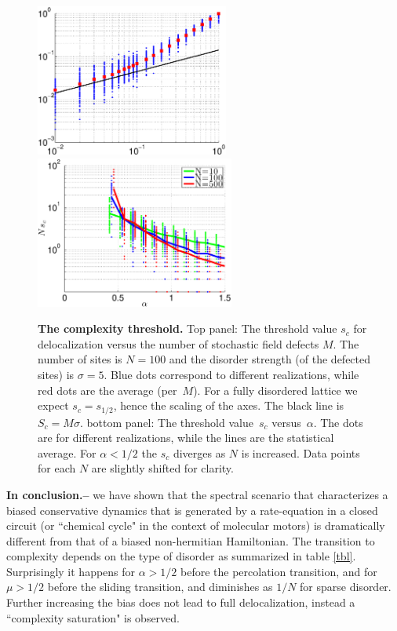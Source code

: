 \documentclass[aps,pre,floats,floatfix,twocolumn]{revtex4}
\newcommand{\Eq}[1]{\textcolor{blue}{{equation}\!~(\ref{#1})}}
\newcommand{\sect}[1]{{\bf #1.-- }}
\begin{document}
\begin{figure}
\includegraphics[height=5cm]{s_c_sparse_100_loglog}
\includegraphics[height=5cm]{s_c_vs_alpha}

\caption{\label{figSc}
{\bf The complexity threshold.}
%
Top panel: The threshold value $s_c$ for delocalization versus the number of stochastic field defects $M$. 
The number of sites is $N{=}100$ and the disorder strength (of the defected sites) is $\sigma{=}5$. 
Blue dots correspond to different realizations, while red dots are the average (per~$M$). 
For a fully disordered lattice we expect $s_c=s_{1/2}$, hence the scaling of the axes. 
The black line is $S_c=M\sigma$. %
%
bottom panel: The threshold value~$s_c$ versus~$\alpha$. 
The dots are for different realizations, while the lines are the statistical average.  
For ${\alpha<1/2}$ the $s_c$ diverges as $N$ is increased.  
Data points for each $N$ are slightly shifted for clarity.
}
\end{figure}




\sect{In conclusion}  
we have shown that the spectral scenario that characterizes a biased conservative dynamics 
that is generated by a rate-equation in a closed circuit (or ``chemical cycle" in the context 
of molecular motors) is dramatically different from that of a biased non-hermitian Hamiltonian. 
The transition to complexity depends on the type of disorder as summarized in table \ref{tbl}. 
Surprisingly it happens for ${\alpha>1/2}$ before the percolation transition, 
and for ${\mu>1/2}$ before the sliding transition, and diminishes as $1/N$ for sparse disorder.
Further increasing the bias does not lead to full delocalization, instead a ``complexity saturation" is observed.
\end{document}
